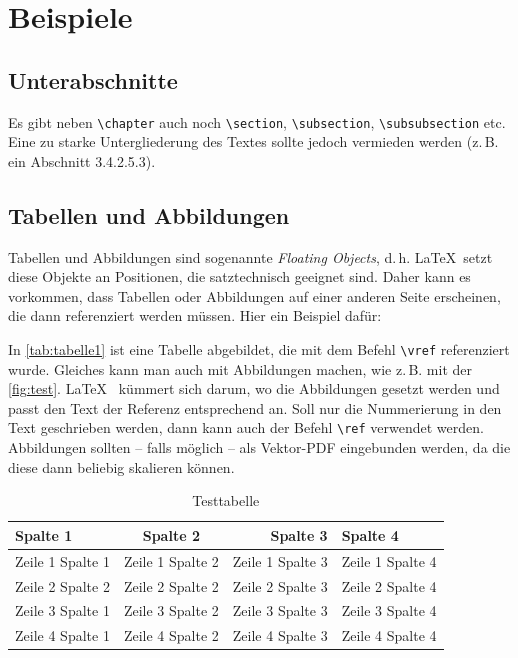 \section{Beispiele}


\subsection{Unterabschnitte}
Es gibt neben \texttt{\textbackslash chapter} auch noch  \texttt{\textbackslash section}, \texttt{\textbackslash subsection}, \texttt{\textbackslash subsubsection} etc. Eine zu starke Untergliederung des Textes sollte jedoch vermieden werden (z.\,B. ein Abschnitt 3.4.2.5.3). 

\subsection{Tabellen und Abbildungen}
Tabellen und Abbildungen sind sogenannte \textit{Floating Objects}, d.\,h. \LaTeX\ setzt diese Objekte an Positionen, die satztechnisch geeignet sind. Daher kann es vorkommen, dass Tabellen oder Abbildungen auf einer anderen Seite erscheinen, die dann referenziert werden müssen. Hier ein Beispiel dafür: 

In \autoref{tab:tabelle1} ist eine Tabelle abgebildet, die mit dem Befehl \texttt{\textbackslash vref} referenziert wurde. Gleiches kann man auch mit Abbildungen 
machen, wie z.\,B. mit der \autoref{fig:test}. \LaTeX~ kümmert sich darum, wo die Abbildungen gesetzt werden und passt den Text der Referenz entsprechend an. Soll nur die Nummerierung in den Text geschrieben werden, dann kann auch der Befehl \texttt{\textbackslash ref} verwendet werden.
Abbildungen sollten -- falls möglich -- als Vektor-PDF eingebunden 
werden, da die diese dann beliebig skalieren können.


\begin{table}[h!]
	\centering
	\begin{tabular}{p{3cm}crl}
		\textbf{Spalte 1} & \textbf{Spalte 2} & \textbf{Spalte 3} & \textbf{Spalte 4}\\\toprule
		Zeile 1 Spalte 1 &  Zeile 1 Spalte 2 & Zeile 1 Spalte 3 & Zeile 1 Spalte 4\\
		Zeile 2 Spalte 2 &  Zeile 2 Spalte 2 & Zeile 2 Spalte 3 & Zeile 2 Spalte 4\\\midrule
		Zeile 3 Spalte 1 &  Zeile 3 Spalte 2 & Zeile 3 Spalte 3 & Zeile 3 Spalte 4\\
		Zeile 4 Spalte 1 &  Zeile 4 Spalte 2 & Zeile 4 Spalte 3 & Zeile 4 Spalte 4\\\bottomrule
	\end{tabular}
	\caption[Testtabelle]{\label{tab:tabelle1}Testtabelle}
\end{table}

